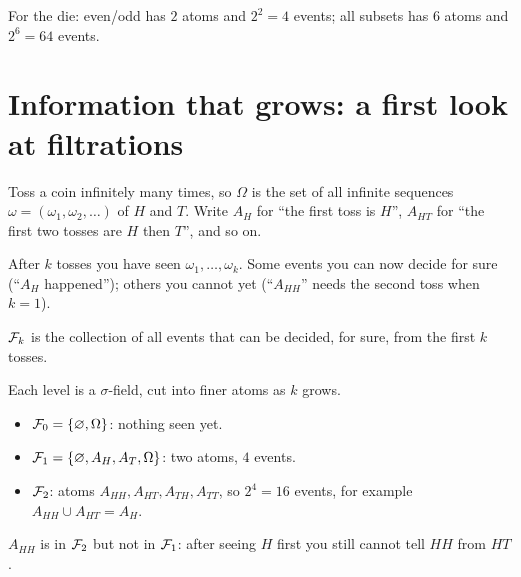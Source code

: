 For the die: even/odd has $2$ atoms and $2^2=4$ events; all subsets has $6$ atoms and $2^6=64$ events.

\section{Information that grows: a first look at filtrations}
\label{sec:info}

Toss a coin infinitely many times, so $\Omega$ is the set of all infinite sequences $\omega=(\omega_1,\omega_2,\ldots)$ of $H$ and $T$. Write $A_H$ for ``the first toss is $H$'', $A_{HT}$ for ``the first two tosses are $H$ then $T$'', and so on.

After $k$ tosses you have seen $\omega_1,\dots,\omega_k$. Some events you can now decide for sure (``$A_H$ happened''); others you cannot yet (``$A_{HH}$'' needs the second toss when $k=1$).

\begin{definition}
$\mathcal F_k$ is the collection of all events that can be decided, for sure, from the first $k$ tosses.
\end{definition}

\begin{example}
\label{ex:coin-filtration}
Each level is a $\sigma$-field, cut into finer atoms as $k$ grows.
\begin{itemize}
  \item $\mathcal F_0=\{\varnothing,\Omega\}$: nothing seen yet.
  \item $\mathcal F_1=\{\varnothing,A_H,A_T,\Omega\}$: two atoms, $4$ events.
  \item $\mathcal F_2$: atoms $A_{HH},A_{HT},A_{TH},A_{TT}$, so $2^4=16$ events, for example $A_{HH}\cup A_{HT}=A_H$.
\end{itemize}
$A_{HH}$ is in $\mathcal F_2$ but not in $\mathcal F_1$: after seeing $H$ first you still cannot tell $HH$ from $HT$.
\end{example}

\begin{pic}
\end{pic}

